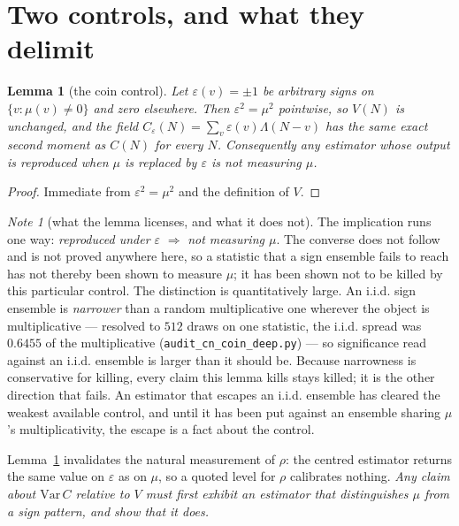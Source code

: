 \documentclass[11pt,a4paper]{article}
\theoremstyle{plain}
\newtheorem{lemma}[theorem]{Lemma}
\theoremstyle{definition}
\theoremstyle{remark}
\newtheorem{note}[theorem]{Note}
\begin{document}
\section{Two controls, and what they delimit}\label{sec:controls}

\begin{lemma}[the coin control]\label{lem:coin}
Let $\varepsilon(v)=\pm1$ be arbitrary signs on
$\{v:\mu(v)\neq0\}$ and zero elsewhere. Then $\varepsilon^2=\mu^2$
pointwise, so $V(N)$ is unchanged, and the field
$C_\varepsilon(N)=\sum_v\varepsilon(v)\Lambda(N-v)$ has the same exact
second moment as $C(N)$ for every $N$. Consequently any estimator
whose output is reproduced when $\mu$ is replaced by $\varepsilon$ is
not measuring $\mu$.
\end{lemma}

\begin{proof}
Immediate from $\varepsilon^2=\mu^2$ and the definition of $V$.
\end{proof}

\begin{note}[what the lemma licenses, and what it does not]%
\label{note:coinscope}
The implication runs one way: \emph{reproduced under $\varepsilon$}
$\Rightarrow$ \emph{not measuring $\mu$}. The converse does not follow
and is not proved anywhere here, so a statistic that a sign ensemble
fails to reach has not thereby been shown to measure $\mu$; it has
been shown not to be killed by this particular control. The
distinction is quantitatively large. An i.i.d. sign ensemble is
\emph{narrower} than a random multiplicative one wherever the object
is multiplicative --- resolved to $512$ draws on one statistic, the
i.i.d. spread was $0.6455$ of the multiplicative
(\texttt{audit\_cn\_coin\_deep.py}) --- so significance
read against an i.i.d. ensemble is larger than it should be. Because
narrowness is conservative for killing, every claim this lemma kills
stays killed; it is the other direction that fails. An estimator that
escapes an i.i.d. ensemble has cleared the weakest available control,
and until it has been put against an ensemble sharing $\mu$'s
multiplicativity, the escape is a fact about the control.
\end{note}

Lemma~\ref{lem:coin} invalidates the natural measurement of $\rho$:
the centred estimator returns the same value on $\varepsilon$ as on
$\mu$, so a quoted level for $\rho$ calibrates nothing. \emph{Any
claim about $\mathrm{Var}\,C$ relative to $V$ must first exhibit an
estimator that distinguishes $\mu$ from a sign pattern, and show that
it does.}
\end{document}
